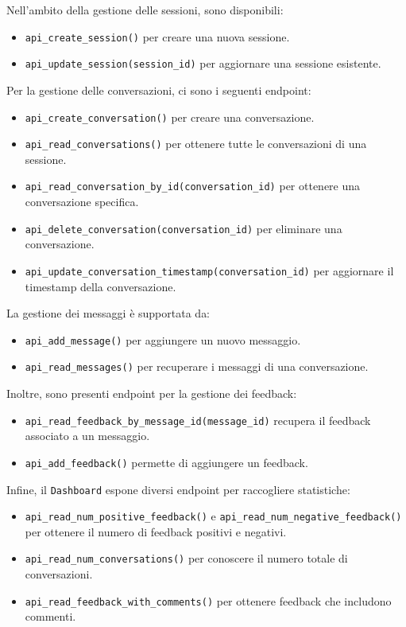 Nell’ambito della gestione delle sessioni, sono disponibili:
\begin{itemize}
    \item \texttt{api\_create\_session()} per creare una nuova sessione.
    \item \texttt{api\_update\_session(session\_id)} per aggiornare una sessione esistente.
\end{itemize}

Per la gestione delle conversazioni, ci sono i seguenti endpoint:
\begin{itemize}
    \item \texttt{api\_create\_conversation()} per creare una conversazione.
    \item \texttt{api\_read\_conversations()} per ottenere tutte le conversazioni di una sessione.
    \item \texttt{api\_read\_conversation\_by\_id(conversation\_id)} per ottenere una conversazione specifica.
    \item \texttt{api\_delete\_conversation(conversation\_id)} per eliminare una conversazione.
    \item \texttt{api\_update\_conversation\_timestamp(conversation\_id)} per aggiornare il timestamp della conversazione.
\end{itemize}

La gestione dei messaggi è supportata da:
\begin{itemize}
    \item \texttt{api\_add\_message()} per aggiungere un nuovo messaggio.
    \item \texttt{api\_read\_messages()} per recuperare i messaggi di una conversazione.
\end{itemize}

Inoltre, sono presenti endpoint per la gestione dei feedback:
\begin{itemize}
    \item \texttt{api\_read\_feedback\_by\_message\_id(message\_id)} recupera il feedback associato a un messaggio.
    \item \texttt{api\_add\_feedback()} permette di aggiungere un feedback.
\end{itemize}

Infine, il \texttt{Dashboard} espone diversi endpoint per raccogliere statistiche:
\begin{itemize}
    \item \texttt{api\_read\_num\_positive\_feedback()} e \texttt{api\_read\_num\_negative\_feedback()} per ottenere il numero di feedback positivi e negativi.
    \item \texttt{api\_read\_num\_conversations()} per conoscere il numero totale di conversazioni.
    \item \texttt{api\_read\_feedback\_with\_comments()} per ottenere feedback che includono commenti.
\end{itemize}

